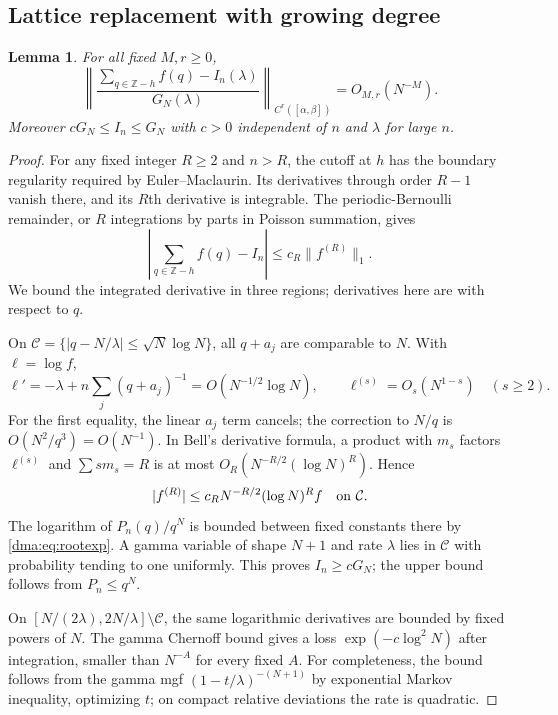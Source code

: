 \documentclass[11pt,letterpaper]{article}
\newtheorem{lemma}[theorem]{Lemma}
\theoremstyle{remark}\newtheorem{remark}[theorem]{Remark}
\begin{document}
\subsection{Lattice replacement with growing degree}
\begin{lemma}\label{dma:lem:em}
For all fixed $M,r\geq0$,
\[
 \left\|\frac{\sum_{q\in\mathbb Z-h}f(q)-I_n(\lambda)}{G_N(\lambda)}
 \right\|_{C^r([\alpha,\beta])}=O_{M,r}(N^{-M}).
\]
Moreover $cG_N\leq I_n\leq G_N$ with $c>0$ independent of $n$ and $\lambda$ for large $n$.
\end{lemma}
\begin{proof}
For any fixed integer $R\geq2$ and $n>R$, the cutoff at $h$ has the boundary regularity required by Euler--Maclaurin. Its derivatives through order $R-1$ vanish there, and its $R$th derivative is integrable. The periodic-Bernoulli remainder, or $R$ integrations by parts in Poisson summation, gives
\begin{equation}\label{dma:eq:em}
 \left|\sum_{q\in\mathbb Z-h}f(q)-I_n\right|
 \leq c_R\|f^{(R)}\|_1.
\end{equation}
We bound the integrated derivative in three regions; derivatives here are with respect to $q$.

On $\mathcal C=\{|q-N/\lambda|\leq\sqrt N\log N\}$, all $q+a_j$ are comparable to $N$. With $\ell=\log f$,
\[
 \ell'=-\lambda+n\sum_j(q+a_j)^{-1}
 =O(N^{-1/2}\log N),\qquad
 \ell^{(s)}=O_s(N^{1-s})\quad(s\geq2).
\]
For the first equality, the linear $a_j$ term cancels; the correction to $N/q$ is $O(N^2/q^3)=O(N^{-1})$. In Bell's derivative formula, a product with $m_s$ factors $\ell^{(s)}$ and $\sum s m_s=R$ is at most $O_R(N^{-R/2}(\log N)^R)$. Hence
\begin{equation}\label{dma:eq:centralderivative}
 |f^{(R)}|\leq c_R N^{-R/2}(\log N)^R f\quad\hbox{on }\mathcal C.
\end{equation}
The logarithm of $P_n(q)/q^N$ is bounded between fixed constants there by \eqref{dma:eq:rootexp}. A gamma variable of shape $N+1$ and rate $\lambda$ lies in $\mathcal C$ with probability tending to one uniformly. This proves $I_n\geq cG_N$; the upper bound follows from $P_n\leq q^N$.

On $[N/(2\lambda),2N/\lambda]\setminus\mathcal C$, the same logarithmic derivatives are bounded by fixed powers of $N$. The gamma Chernoff bound gives a loss $\exp(-c\log^2N)$ after integration, smaller than $N^{-A}$ for every fixed $A$. For completeness, the bound follows from the gamma mgf $(1-t/\lambda)^{-(N+1)}$ by exponential Markov inequality, optimizing $t$; on compact relative deviations the rate is quadratic.


\end{proof}
\end{document}

